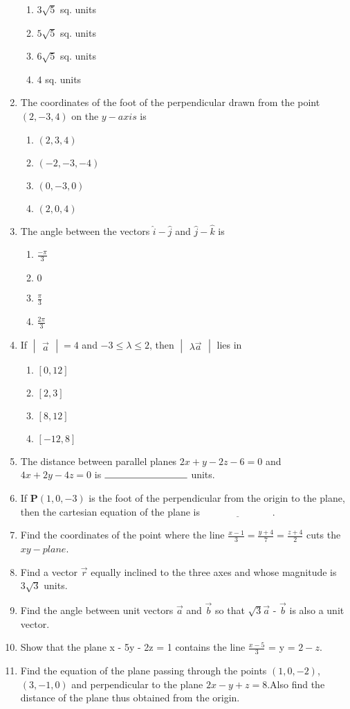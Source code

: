 \documentclass[12pt,-letter paper]{article}
\let\vec\mathbf{}
\let\vec\mathbf{}
\providecommand{\mydet}[1]{\ensuremath{\begin{vmatrix}#1\end{vmatrix}}}               \providecommand{\myvec}[1]{\ensuremath{\begin{bmatrix}#1\end{bmatrix}}}
\providecommand{\sbrak}[1]{\ensuremath{{}\left[#1\right]}}
\providecommand{\brak}[1]{\ensuremath{\left(#1\right)}}
\begin{document}
\begin{enumerate}
\begin{enumerate}
\item $3\sqrt{5}$ sq. units
\item $5\sqrt{5}$ sq. units
\item $6\sqrt{5}$ sq. units
\item $4$ sq. units
\end{enumerate}
\item The coordinates of the foot of the perpendicular drawn from the point $\brak{2,-3,4}$ on the $y-axis$ is
\begin{enumerate}
\item $\brak{2, 3, 4}$
\item $\brak{-2,-3,-4}$
\item $\brak{0,-3, 0}$
\item $\brak{2, 0,4}$
\end{enumerate}
\item The angle between the vectors $\hat{i} - \hat{j}$ and $\hat{j} - \hat{k}$ is
\begin{enumerate}
\item $\frac{-\pi}{3}$
\item $0$
\item $\frac{\pi}{3}$
\item $\frac{2\pi}{3}$
\end{enumerate}
\item If $\mydet{\overrightarrow{a}}= 4$ and $-3 \leq \lambda \leq 2$, then $\mydet{\lambda \overrightarrow a}$ lies in
\begin{enumerate}
\item $\sbrak{0,12}$
\item $\sbrak{2,3}$
\item $\sbrak{8,12}$
\item $\sbrak{-12,8}$
\end{enumerate}
\item The distance between parallel planes $2x + y - 2z - 6 = 0$ and $4x + 2y - 4z = 0$ is $\rule{3cm}{0.15mm}$ units.
\item If $\vec{P}\brak{1,  0, -3}$ is the foot of the perpendicular from the origin to the plane, then the cartesian equation of the plane is $\underline{\hspace{3cm}}$.
\item Find the coordinates of the point where the line $\frac{x-1}{3} = \frac{y+4}{7} = \frac{z+4}{2}$ cuts the $xy-plane$.
\item Find a vector $\overrightarrow{r}$ equally inclined to the three axes and whose magnitude is $3\sqrt{3}$ units.
\item Find the angle between unit vectors $\overrightarrow{a}$ and $\overrightarrow{b}$ so that $\sqrt{3}\overrightarrow{a}$ - $\overrightarrow{b}$ is also a unit vector.
\item Show that the plane x - 5y - 2z = 1 contains the line $\frac{x - 5}{3}$ = y = $2 -z$.
\item Find the equation of the plane passing through the points $\brak{1, 0, -2}$,  $\brak{3, -1, 0}$ and perpendicular to the plane $2x - y + z = 8$.Also find the distance of the plane thus obtained from the origin.
\end{enumerate}
\end{document}
